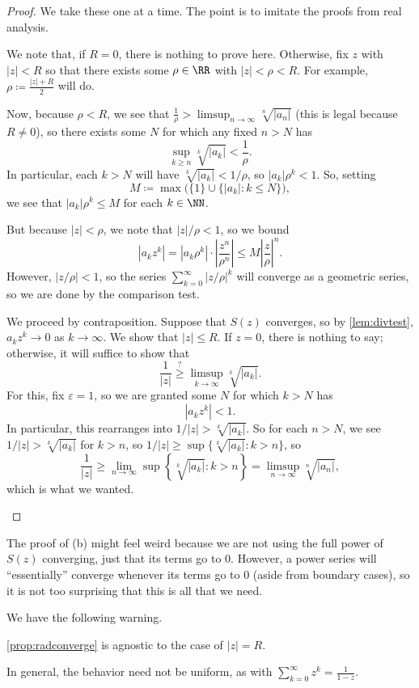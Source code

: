 \begin{proof}
	We take these one at a time. The point is to imitate the proofs from real analysis.
	\begin{listalph}
		\item We note that, if $R=0$, there is nothing to prove here. Otherwise, fix $z$ with $|z|<R$ so that there exists some $\rho\in\RR$ with $|z|<\rho<R$. For example, $\rho\coloneqq \frac{|z|+R}2$ will do.

		Now, because $\rho<R$, we see that $\frac1\rho>\limsup_{n\to\infty}\sqrt[n]{|a_n|}$ (this is legal because $R\ne0$), so there exists some $N$ for which any fixed $n>N$ has
		\[\sup_{k\ge n}\sqrt[k]{|a_k|}<\frac1\rho.\]
		In particular, each $k>N$ will have $\sqrt[k]{|a_k|}<1/\rho$, so $|a_k|\rho^k<1$. So, setting
		\[M\coloneqq \max\big(\{1\}\cup\{|a_k|:k\le N\}\big),\]
		we see that $|a_k|\rho^k\le M$ for each $k\in\NN$.
		
		But because $|z|<\rho$, we note that $|z|/\rho<1$, so we bound
		\[\left|a_kz^k\right|=\left|a_k\rho^k\right|\cdot\left|\frac{z^n}{\rho^n}\right|\le M\left|\frac z\rho\right|^n.\]
		However, $|z/\rho|<1$, so the series $\sum_{k=0}^\infty|z/\rho|^k$ will converge as a geometric series, so we are done by the comparison test.

		\item We proceed by contraposition. Suppose that $S(z)$ converges, so by \autoref{lem:divtest}, $a_kz^k\to0$ as $k\to\infty$. We show that $|z|\le R$. If $z=0$, there is nothing to say; otherwise, it will suffice to show that
		\[\frac1{|z|}\stackrel?\ge\limsup_{k\to\infty}\sqrt[k]{|a_k|}.\]
		For this, fix $\varepsilon=1$, so we are granted some $N$ for which $k>N$ has
		\[\left|a_kz^k\right|<1.\]
		In particular, this rearranges into $1/|z|>\sqrt[k]{|a_k|}$. So for each $n>N$, we see $1/|z|>\sqrt[k]{|a_k|}$ for $k>n$, so $1/|z|\ge\sup\{\sqrt[k]{|a_k|}:k>n\}$, so
		\[\frac1{|z|}\ge\lim_{n\to\infty}\sup\left\{\sqrt[k]{|a_k|}:k>n\right\}=\limsup_{n\to\infty}\sqrt[n]{|a_n|},\]
		which is what we wanted.
		\qedhere
	\end{listalph}
\end{proof}
\begin{remark}[Nir]
	The proof of (b) might feel weird because we are not using the full power of $S(z)$ converging, just that its terms go to $0$. However, a power series will ``essentially'' converge whenever its terms go to $0$ (aside from boundary cases), so it is not too surprising that this is all that we need.
\end{remark}
We have the following warning.
\begin{warn}
	\autoref{prop:radconverge} is agnostic to the case of $|z|=R$.
\end{warn}
In general, the behavior need not be uniform, as with $\sum_{k=0}^\infty z^k=\frac1{1-z}$.

